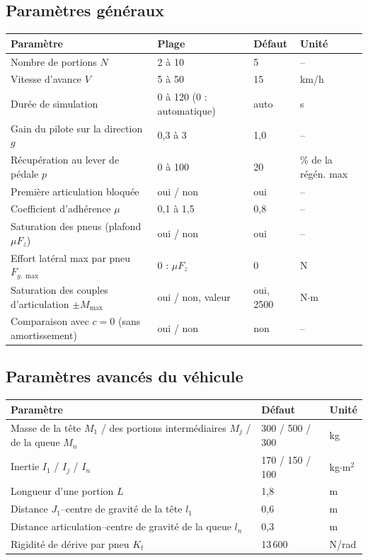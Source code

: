\documentclass[11pt,a4paper]{article}
\begin{document}
\subsection{Paramètres généraux}
\begin{center}\small
\begin{tabular}{@{}p{6.6cm}lll@{}}\toprule
Paramètre & Plage & Défaut & Unité\\\midrule
Nombre de portions $N$ & 2 à 10 & 5 & --\\
Vitesse d'avance $V$ & 5 à 50 & 15 & km/h\\
Durée de simulation & 0 à 120 (0 : automatique) & auto & s\\
Gain du pilote sur la direction $g$ & 0,3 à 3 & 1,0 & --\\
Récupération au lever de pédale $p$ & 0 à 100 & 20 & \% de la régén. max\\
Première articulation bloquée & oui / non & oui & --\\
Coefficient d'adhérence $\mu$ & 0,1 à 1,5 & 0,8 & --\\
Saturation des pneus (plafond $\mu F_z$) & oui / non & oui & --\\
Effort latéral max par pneu $F_{y,\max}$ & 0 : $\mu F_z$ & 0 & N\\
Saturation des couples d'articulation $\pm M_{\max}$ & oui / non, valeur & oui, 2500 & N$\cdot$m\\
Comparaison avec $c=0$ (sans amortissement) & oui / non & non & --\\\bottomrule
\end{tabular}
\end{center}

\subsection{Paramètres avancés du véhicule}
\begin{center}\small
\begin{tabular}{@{}p{8cm}ll@{}}\toprule
Paramètre & Défaut & Unité\\\midrule
Masse de la tête $M_1$ / des portions intermédiaires $M_j$ / de la queue $M_n$ & 300 / 500 / 300 & kg\\
Inertie $I_1$ / $I_j$ / $I_n$ & 170 / 150 / 100 & kg$\cdot$m$^2$\\
Longueur d'une portion $L$ & 1,8 & m\\
Distance $J_1$--centre de gravité de la tête $l_1$ & 0,6 & m\\
Distance articulation--centre de gravité de la queue $l_n$ & 0,3 & m\\
Rigidité de dérive par pneu $K_t$ & 13\,600 & N/rad\\\bottomrule
\end{tabular}
\end{center}
\end{document}
